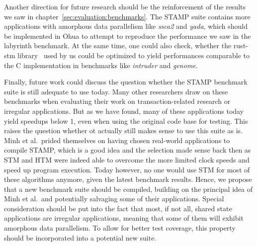 Another direction for future research should be the reinforcement of the results we saw in chapter~\ref{sec:evaluation:benchmarks}.
The STAMP suite contains more applications with amorphous data parallelism like \emph{ssca2} and \emph{yada}, which should be implemented in Ohua to attempt to reproduce the performance we saw in the labyrinth benchmark.
At the same time, one could also check, whether the rust-stm library~\cite{bergmann2020stm} used by us could be optimized to yield performances comparable to the C implementation in benchmarks like \emph{intruder} and \emph{genome}.

Finally, future work could discuss the question whether the STAMP benchmark suite is still adequate to use today.
Many other researchers draw on these benchmarks when evaluating their work on transaction-related research or irregular applications.
But as we have found, many of these applications today yield speedups below 1, even when using the original code base for testing.
This raises the question whether ot actually still makes sense to use this suite as is.
Minh et al.\ prided themselves on having chosen real-world applications to compile STAMP, which is a good idea and the selection made sense back then as STM and HTM were indeed able to overcome the more limited clock speeds and speed up program execution.
Today however, no one would use STM for most of these algorithms anymore, given the latest benchmark results.
Hence, we propose that a new benchmark suite should be compiled, building on the principal idea of Minh et al.\ and potentially salvaging some of their applications.
Special consideration should be put into the fact that most, if not all, shared state applications are irregular applications, meaning that some of them will exhibit amorphous data parallelism.
To allow for better test coverage, this property should be incorporated into a potential new suite.

